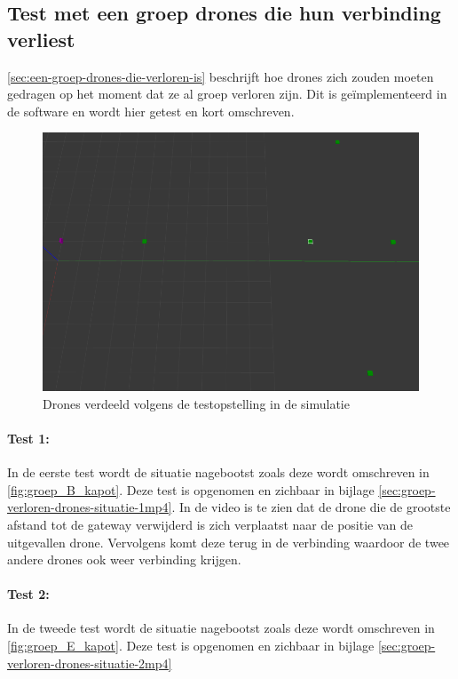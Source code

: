 \documentclass[a4paper, 11pt, oneside]{report}
\begin{document}
\subsection{Test met een groep drones die hun verbinding verliest}
\autoref{sec:een-groep-drones-die-verloren-is} beschrijft hoe drones zich zouden moeten gedragen op het moment dat ze al groep verloren zijn.
Dit is geïmplementeerd in de software en wordt hier getest en kort omschreven.

\begin{figure}[H]
	\begin{center}\includegraphics[width=.7\linewidth]{Afbeeldingen/testopstelling2_in_simulatie.png}\end{center}
	\caption{Drones verdeeld volgens de testopstelling in de simulatie}
	\label{fig:applicatie-testopstelling-2-drones-in-sim}
\end{figure}


\paragraph{Test 1:} In de eerste test wordt de situatie nagebootst zoals deze wordt omschreven in \autoref{fig:groep_B_kapot}.
Deze test is opgenomen en zichbaar in bijlage \ref{sec:groep-verloren-drones-situatie-1mp4}. 
In de video is te zien dat de drone die de grootste afstand tot de gateway verwijderd is zich verplaatst naar de positie van de uitgevallen drone. Vervolgens komt deze terug in de verbinding waardoor de twee andere drones ook weer verbinding krijgen.  

\paragraph{Test 2:} In de tweede test wordt de situatie nagebootst zoals deze wordt omschreven in \autoref{fig:groep_E_kapot}.
Deze test is opgenomen en zichbaar in bijlage \ref{sec:groep-verloren-drones-situatie-2mp4}
\end{document}
